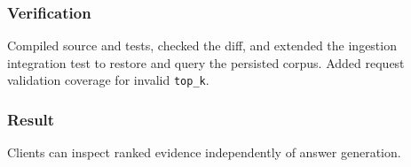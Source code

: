 \subsubsection{Verification}

Compiled source and tests, checked the diff, and extended the ingestion integration test to restore and query the persisted corpus. Added request validation coverage for invalid \texttt{top\_k}.

\subsubsection{Result}

Clients can inspect ranked evidence independently of answer generation.


